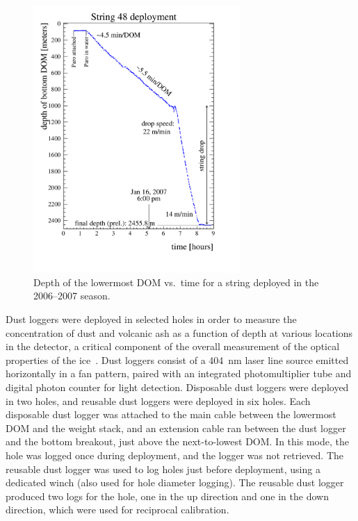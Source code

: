 \begin{figure}[!ht]
 \centering
 \includegraphics[width=0.70\textwidth]{graphics/drill/String48_deploy.pdf}
\caption{Depth of the lowermost DOM vs.~time for a string deployed in the
  2006--2007 season.}
\label{fig:deploytime}
\end{figure}

Dust loggers were deployed in selected holes in order to measure the
concentration of dust and volcanic ash as a function of depth at various
locations in the detector, a critical component of the overall measurement
of the optical properties of the ice~\cite{Aartsen:2013rt,citeulike:2998650}. Dust loggers 
consist of a 404~nm laser line source emitted horizontally in a
fan pattern, paired with an integrated
photomultiplier tube and digital photon counter for light
detection. Disposable dust loggers were deployed in two holes, and reusable dust loggers were
deployed in six holes. Each disposable dust
logger was attached to the main cable between the lowermost DOM and the
weight stack, and an extension cable ran between the dust logger and the
bottom breakout, just above the next-to-lowest DOM. In this mode, the hole
was logged once during deployment, and the logger was not
retrieved. The reusable dust logger was used to
log holes just before deployment, using a dedicated winch (also used for
hole diameter logging). The reusable dust logger produced two logs for the
hole, one in the up direction and one in the down direction, which were used for
reciprocal calibration.


